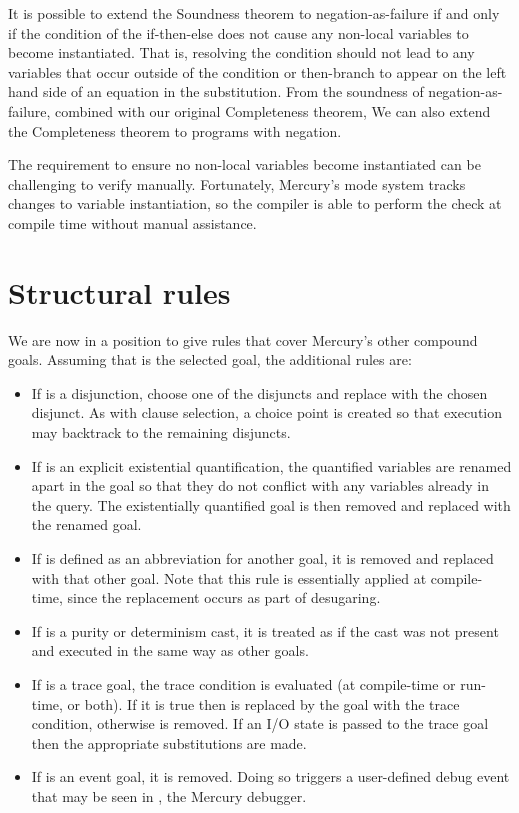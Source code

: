 It is possible to extend the Soundness theorem\label{gi:soundness2}
to negation-as-failure if and only if
the condition of the if-then-else
does not cause any non-local variables to become instantiated.
That is, resolving the condition
should not lead to any variables
that occur outside of the condition or then-branch
to appear on the left hand side of an equation in the substitution.
From the soundness of negation-as-failure,
combined with our original Completeness theorem,
We can also extend the Completeness theorem\label{gi:completeness2}
to programs with negation.

The requirement to ensure no non-local variables become instantiated
can be challenging to verify manually.
Fortunately,
Mercury's mode system tracks changes to variable instantiation,
so the compiler is able to perform the check at compile time
without manual assistance.


\section{Structural rules}
\label{sec:structure}

We are now in a position to give rules
that cover Mercury's other compound goals.
Assuming that  is the selected goal,
the additional rules are:

\begin{itemize}
\item
If  is a disjunction,
choose one of the disjuncts
and replace  with the chosen disjunct.
As with clause selection,
a choice point is created so that
execution may backtrack to the remaining disjuncts.
\item
If  is an explicit existential quantification,
the quantified variables are renamed apart in the goal
so that they do not conflict with any variables already in the query.
The existentially quantified goal is then removed
and replaced with the renamed goal.
\item
If  is defined as an abbreviation for another goal,
it is removed and replaced with that other goal.
Note that this rule is essentially applied at compile-time,
since the replacement occurs as part of desugaring.
\item
If  is a purity or determinism cast,
it is treated as if the cast was not present
and executed in the same way as other goals.
\item
If  is a trace goal,
the trace condition is evaluated
(at compile-time or run-time, or both).
If it is true then  is replaced
by the goal with the trace condition,
otherwise  is removed.
If an I/O state is passed to the trace goal
then the appropriate substitutions are made.
\item
If  is an event goal,
it is removed.
Doing so triggers a user-defined debug event
that may be seen in ,
the Mercury debugger.
\end{itemize}


